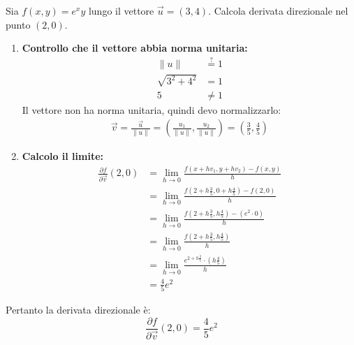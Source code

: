 \documentclass{article}  %
\begin{document}
\begin{esercizio}[Esercizio]
	Sia $f(x,y)=e^x y$ lungo il vettore $\vec{u}=(3,4)$. Calcola derivata direzionale nel punto $(2,0)$.
	\begin{enumerate}
		\item \textbf{Controllo che il vettore abbia norma unitaria:}
		      \begin{align*}
			      \|u\|          & \overset{?}=1 \\
			      \sqrt{3^2+4^2} & =1            \\
			      5              & \neq 1
		      \end{align*}
		      Il vettore non ha norma unitaria, quindi devo normalizzarlo:
		      \begin{align*}
			      \vec{v}=\frac{\vec{u}}{\|u\|}=\left(\frac{u_1}{\|u\|},\frac{u_2}{\|u\|}\right)=\left(\frac{3}{5},\frac{4}{5}\right)
		      \end{align*}
		\item \textbf{Calcolo il limite:}
		      \begin{align*}
			      \frac{\partial f}{\partial \vec{v}}(2,0) & = \lim_{h \to 0} \frac{f(x+hv_1,y+hv_2)-f(x,y)}{h}                              \\
			                                               & = \lim_{h \to 0} \frac{f(2+h\frac{3}{5},0+h\frac{4}{5})-f(2,0)}{h}              \\
			                                               & = \lim_{h \to 0} \frac{f(2+h\frac{3}{5},h\frac{4}{5})-(e^2 \cdot 0)}{h}         \\
			                                               & = \lim_{h \to 0} \frac{f(2+h\frac{3}{5},h\frac{4}{5})}{h}                       \\
			                                               & = \lim_{h \to 0} \frac{e^{2+h\frac{3}{5}} \cdot  \left(h \frac{4}{5}\right)}{h} \\
			                                               & = \frac{4}{5}e^2
		      \end{align*}
	\end{enumerate}
	Pertanto la derivata direzionale è:
	\[
		\frac{\partial f}{\partial \vec{v}}(2,0)=\frac{4}{5}e^2
	\]
\end{esercizio}
\end{document}
